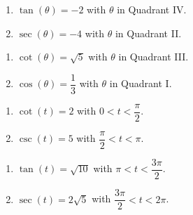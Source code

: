 \begin{multicols}{2}

\begin{enumerate}

\setcounter{enumi}{\value{HW}}

\item  $\tan(\theta) = -2$ with $\theta$ in Quadrant IV.
\item  $\sec(\theta) = -4$ with $\theta$ in Quadrant II.

\setcounter{HW}{\value{enumi}}

\end{enumerate}

\end{multicols}

\begin{multicols}{2}

\begin{enumerate}

\setcounter{enumi}{\value{HW}}

\item $\cot(\theta) = \sqrt{5}$ with $\theta$ in Quadrant III. 
\item  $\cos(\theta) = \dfrac{1}{3}$ with $\theta$ in Quadrant I.

\setcounter{HW}{\value{enumi}}

\end{enumerate}

\end{multicols}

\begin{multicols}{2}

\begin{enumerate}

\setcounter{enumi}{\value{HW}}

\item  $\cot(t) = 2$ with $0  < t < \dfrac{\pi}{2}$.
\item  $\csc(t) = 5$ with $\dfrac{\pi}{2} < t < \pi$.

\setcounter{HW}{\value{enumi}}

\end{enumerate}

\end{multicols}

\begin{multicols}{2}

\begin{enumerate}

\setcounter{enumi}{\value{HW}}

\item  $\tan(t) = \sqrt{10}$ with $\pi < t < \dfrac{3\pi}{2}$.
\item  $\sec(t) = 2\sqrt{5}$ with $\dfrac{3\pi}{2} < t < 2\pi$.\label{useidsforvalueslast02}


\setcounter{HW}{\value{enumi}}

\end{enumerate}

\end{multicols}


